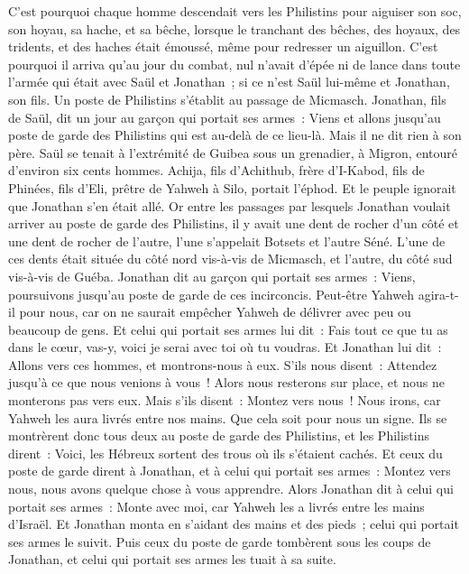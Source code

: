 \begin{multicols}{2}
C'est pourquoi chaque homme descendait vers les Philistins pour aiguiser son soc, son hoyau, sa hache, et sa bêche,
lorsque le tranchant des bêches, des hoyaux, des tridents, et des haches était émoussé, même pour redresser un aiguillon.
C'est pourquoi il arriva qu'au jour du combat, nul n'avait d'épée ni de lance dans toute l'armée qui était avec Saül et Jonathan~; si ce n'est Saül lui-même et Jonathan, son fils.
Un poste de Philistins s'établit au passage de Micmasch.
\VerseOne{}Jonathan, fils de Saül, dit un jour au garçon qui portait ses armes~: Viens et allons jusqu'au poste de garde des Philistins qui est au-delà de ce lieu-là. Mais il ne dit rien à son père.
Saül se tenait à l'extrémité de Guibea sous un grenadier, à Migron, entouré d'environ six cents hommes.
Achija, fils d'Achithub, frère d'I-Kabod, fils de Phinées, fils d'Eli, prêtre de Yahweh à Silo, portait l'éphod. Et le peuple ignorait que Jonathan s'en était allé.
Or entre les passages par lesquels Jonathan voulait arriver au poste de garde des Philistins, il y avait une dent de rocher d'un côté et une dent de rocher de l'autre, l'une s'appelait Botsets et l'autre Séné.
L'une de ces dents était située du côté nord vis-à-vis de Micmasch, et l'autre, du côté sud vis-à-vis de Guéba.
Jonathan dit au garçon qui portait ses armes~: Viens, poursuivons jusqu'au poste de garde de ces incirconcis. Peut-être Yahweh agira-t-il pour nous, car on ne saurait empêcher Yahweh de délivrer avec peu ou beaucoup de gens.
Et celui qui portait ses armes lui dit~: Fais tout ce que tu as dans le cœur, vas-y, voici je serai avec toi où tu voudras.
Et Jonathan lui dit~: Allons vers ces hommes, et montrons-nous à eux.
S'ils nous disent~: Attendez jusqu'à ce que nous venions à vous~! Alors nous resterons sur place, et nous ne monterons pas vers eux.
Mais s'ils disent~: Montez vers nous~! Nous irons, car Yahweh les aura livrés entre nos mains. Que cela soit pour nous un signe.
Ils se montrèrent donc tous deux au poste de garde des Philistins, et les Philistins dirent~: Voici, les Hébreux sortent des trous où ils s'étaient cachés.
Et ceux du poste de garde dirent à Jonathan, et à celui qui portait ses armes~: Montez vers nous, nous avons quelque chose à vous apprendre. Alors Jonathan dit à celui qui portait ses armes~: Monte avec moi, car Yahweh les a livrés entre les mains d'Israël.
Et Jonathan monta en s'aidant des mains et des pieds~; celui qui portait ses armes le suivit. Puis ceux du poste de garde tombèrent sous les coups de Jonathan, et celui qui portait ses armes les tuait à sa suite.

\end{multicols}

